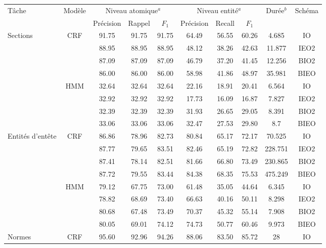 \begin{table}[ht]
\scriptsize
\begin{center}
\begin{tabular}{p{0.9cm}|c|cccccccc}
\hline \noalign{\smallskip}
Tâche & Modèle & \multicolumn{3}{c}{Niveau atomique$^a$} & \multicolumn{3}{c}{Niveau entité$^a$} & \multirow{2}{*}{Durée$^b$} & Schéma \\
 & & Précision & Rappel & $F_1$ &  Précision & Recall & $F_1$ &  & \\ \hline %
\multirow{8}{*}{Sections}  & \multirow{4}{*}{CRF} & 91.75 & 91.75 & 91.75 & 64.49 & 56.55 & 60.26 &  4.685  & IO \\
&  & 88.95 & 88.95 & 88.95 & 48.12 & 38.26 & 42.63  & 11.877 & IEO2 \\
&  & 87.09 & 87.09 & 87.09 & 46.79 & 37.20 & 41.45 & 12.256 & BIO2 \\
 &  & 86.00 & 86.00 & 86.00 & 58.98 & 41.86 & 48.97  & 35.981 & BIEO \\ \cline{2-10}
& \multirow{4}{*}{HMM} & 32.64 & 32.64 & 32.64 & 22.16 & 18.91 & 20.41 & 6.564 & IO \\
&  & 32.92 & 32.92 & 32.92 & 17.73 & 16.09 & 16.87  &   7.827  & IEO2 \\
 &  & 32.39 & 32.39 & 32.39 & 31.93 & 26.65 & 29.05 & 8.391 & BIO2 \\
  &  & 33.06 & 33.06 & 33.06 & 32.47 & 27.53 & 29.80 & 8.7 & BIEO \\ \hline %
\multirow{8}{0.9cm}{Entités d'entête}  & \multirow{4}{*}{CRF} & 86.86 & 78.96 & 82.73 & 80.84 & 65.17 & 72.17  & 70.525 & IO \\%
 &  & 87.77 & 79.65 & 83.51 & 82.46 & 65.19 & 72.82  & 228.751 & IEO2 \\
 &  & 87.41 & 78.14 & 82.51 & 81.66 & 66.80 & 73.49 & 230.865 & BIO2 \\
 &  & 87.72 & 79.55 & 83.44 & 84.38 & 68.35 & 75.53 &  475.249 & BIEO \\ \cline{2-10}
  & \multirow{4}{*}{HMM} & 79.12 & 67.75 & 73.00 & 61.48 & 35.05 & 44.64 & 6.345 & IO \\
  &  & 78.82 & 68.69 & 73.40 & 66.63 & 40.16 & 50.11& 8.298 & IEO2 \\ 
  &  & 80.68 & 67.48 & 73.49 & 70.37 & 45.32 & 55.14 & 7.908 & BIO2 \\
 &  & 80.05 & 69.01 & 74.12 & 74.73 & 50.77 & 60.46 & 9.973 & BIEO \\ \hline
\multirow{8}{*}{Normes}  & \multirow{4}{*}{CRF} & 95.60 & 92.96 & 94.26 & 88.06 & 83.50 & 85.72 & 28 & IO \\%

\end{tabular}
\end{center}
\end{table}
